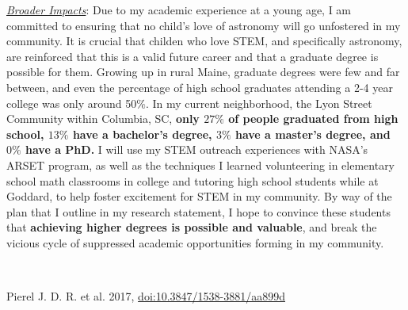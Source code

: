 \underline{\textit{Broader Impacts}}:
Due to my academic experience at a young age, I am committed to
ensuring that no child's love of astronomy will go unfostered in my
community. It is crucial that childen who love STEM, and specifically
astronomy, are reinforced that this is a valid future career and that
a graduate degree is possible for them. Growing up in rural Maine,
graduate degrees were few and far between, and even the percentage of
high school graduates attending a 2-4 year college was only around
50$\%$. In my current neighborhood, the Lyon Street Community within
Columbia, SC, \textbf{only $27\%$ of people graduated from high
school, $13\%$ have a bachelor's degree, $3\%$ have a master's degree,
and $0\%$ have a PhD.} I will use my STEM outreach experiences with
NASA's ARSET program, as well as the techniques I learned volunteering
in elementary school math classrooms in college and tutoring high
school students while at Goddard, to help foster excitement for STEM
in my community. By way of the plan that I outline in my research
statement, I hope to convince these students that \textbf{achieving
higher degrees is possible and valuable}, and break the vicious cycle
of suppressed academic opportunities forming in my community.
\noindent\fontsize{10}{14}\selectfont

\

\noindent[1]Pierel J. D. R. et al. 2017, \href{http://dx.doi.org/10.3847/1538-3881/aa899d}{doi:10.3847/1538-3881/aa899d}
\noindent\fontsize{12}{14}\selectfont

